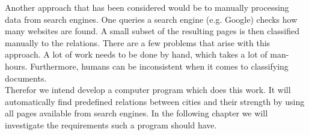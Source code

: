 Another approach that has been considered would be to manually processing data from search engines. One queries a search engine (e.g. Google) checks how many websites are found. A small subset of the resulting pages is then classified manually to the relations. There are a few problems that arise with this approach. A lot of work needs to be done by hand, which takes a lot of man-hours. Furthermore, humans can be inconsistent when it comes to classifying documents. \\

Therefor we intend develop a computer program which does this work. It will automatically find predefined relations between cities and their strength by using all pages available from search engines. In the following chapter we will investigate the requirements such a program should have.